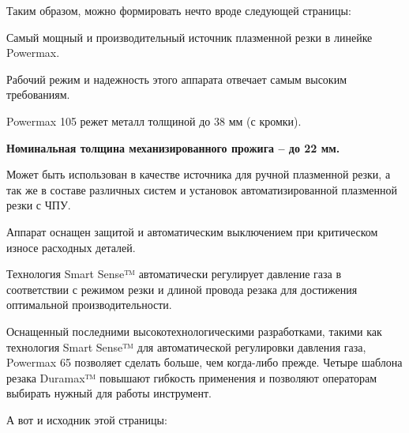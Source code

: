 Таким образом, можно формировать нечто вроде следующей страницы:

\page

{\dontleavehmode
  \vfill

\bTABLE
\setupTABLE[column][1][width=\dimexpr(\textwidth/2)]
\setupTABLE[frame=off,align={width,stretch,tolerant,lohi}]
\bTR
\bTD {} \eTD
\bTD
\startitemize
\item Самый мощный и производительный источник плазменной
  резки в линейке Powermax.

\item Рабочий режим и надежность этого аппарата отвечает
  самым высоким требованиям.

\item Powermax 105 режет металл толщиной до 38 мм (с
  кромки).

\item {\bf Номинальная толщина механизированного прожига –
  до 22 мм.}

\stopitemize
\eTD
\eTR
\eTABLE

\blank[1cm]
\bTABLE
\setupTABLE[column][2][width=\dimexpr(\textwidth/2)]
\setupTABLE[frame=off,align={width,stretch,tolerant,lohi}]
\bTR
\bTD
\startitemize
\item Может быть использован в качестве источника для ручной
  плазменной резки, а так же в составе различных систем и
  установок автоматизированной плазменной резки с ЧПУ.

\item Аппарат оснащен защитой и автоматическим выключением
  при критическом износе расходных деталей.

\item Технология Smart Sense™ автоматически регулирует
  давление газа в соответствии с режимом резки и длиной
  провода резака для достижения оптимальной
  производительности.

\stopitemize
\eTD
\bTD \externalfigure[161.png][factor=fit] \eTD
\eTR
\eTABLE

\bigskip
Оснащенный последними высокотехнологическими разработками,
такими как технология Smart Sense™ для автоматической
регулировки давления газа, Powermax 65 позволяет сделать
больше, чем когда-либо прежде. Четыре шаблона резака
Duramax™ повышают гибкость применения и позволяют операторам
выбирать нужный для работы инструмент.
\vfill
}

\page

А вот и исходник этой страницы:

